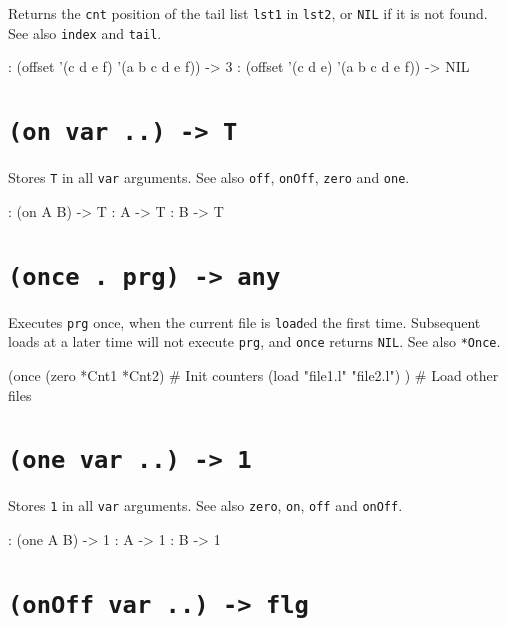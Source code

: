 Returns the \texttt{cnt} position of the tail list \texttt{lst1} in \texttt{lst2}, or \texttt{NIL}
if it is not found. See also \texttt{index} and \texttt{tail}.


\begin{wideverbatim}
: (offset '(c d e f) '(a b c d e f))
-> 3
: (offset '(c d e) '(a b c d e f))
-> NIL
\end{wideverbatim}

 
\section*{\texttt{(on var ..) -> T}}
\label{sec:func-ref-O-(on var ..) -> T}


Stores \texttt{T} in all \texttt{var} arguments. See also \texttt{off}, \texttt{onOff}, \texttt{zero} and
\texttt{one}.


\begin{wideverbatim}
: (on A B)
-> T
: A
-> T
: B
-> T
\end{wideverbatim}

 
\section*{\texttt{(once . prg) -> any}}
\label{sec:func-ref-O-(once . prg) -> any}


Executes \texttt{prg} once, when the current file is \texttt{load}ed the first time. Subsequent loads at a later time will not execute \texttt{prg}, and \texttt{once}
returns \texttt{NIL}. See also \texttt{*Once}.


\begin{wideverbatim}
(once
   (zero *Cnt1 *Cnt2)  # Init counters
   (load "file1.l" "file2.l") )  # Load other files
\end{wideverbatim}

 
\section*{\texttt{(one var ..) -> 1}}
\label{sec:func-ref-O-(one var ..) -> 1}


Stores \texttt{1} in all \texttt{var} arguments. See also \texttt{zero}, \texttt{on}, \texttt{off} and
\texttt{onOff}.


\begin{wideverbatim}
: (one A B)
-> 1
: A
-> 1
: B
-> 1
\end{wideverbatim}

 
\section*{\texttt{(onOff var ..) -> flg}}
\label{sec:func-ref-O-(onOff var ..) -> flg}


